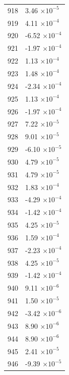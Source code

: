 \documentclass[a4paper,11pt]{article}
\begin{document}
\begin{center}
\begin{longtable}{|R{1.5cm}|R{2.5cm}|}
  918 &         3.46 $\times 10^{          -5}$ \\
  919 &         4.11 $\times 10^{          -4}$ \\
  920 &        -6.52 $\times 10^{          -4}$ \\
  921 &        -1.97 $\times 10^{          -4}$ \\
  922 &         1.13 $\times 10^{          -4}$ \\
  923 &         1.48 $\times 10^{          -4}$ \\
  924 &        -2.34 $\times 10^{          -4}$ \\
  925 &         1.13 $\times 10^{          -4}$ \\
  926 &        -1.97 $\times 10^{          -4}$ \\
  927 &         7.22 $\times 10^{          -5}$ \\
  928 &         9.01 $\times 10^{          -5}$ \\
  929 &        -6.10 $\times 10^{          -5}$ \\
  930 &         4.79 $\times 10^{          -5}$ \\
  931 &         4.79 $\times 10^{          -5}$ \\
  932 &         1.83 $\times 10^{          -4}$ \\
  933 &        -4.29 $\times 10^{          -4}$ \\
  934 &        -1.42 $\times 10^{          -4}$ \\
  935 &         4.25 $\times 10^{          -5}$ \\
  936 &         1.59 $\times 10^{          -4}$ \\
  937 &        -2.23 $\times 10^{          -4}$ \\
  938 &         4.25 $\times 10^{          -5}$ \\
  939 &        -1.42 $\times 10^{          -4}$ \\
  940 &         9.11 $\times 10^{          -6}$ \\
  941 &         1.50 $\times 10^{          -5}$ \\
  942 &        -3.42 $\times 10^{          -6}$ \\
  943 &         8.90 $\times 10^{          -6}$ \\
  944 &         8.90 $\times 10^{          -6}$ \\
  945 &         2.41 $\times 10^{          -5}$ \\
  946 &        -9.39 $\times 10^{          -5}$ \\

\end{longtable}
\end{center}
\end{document}

